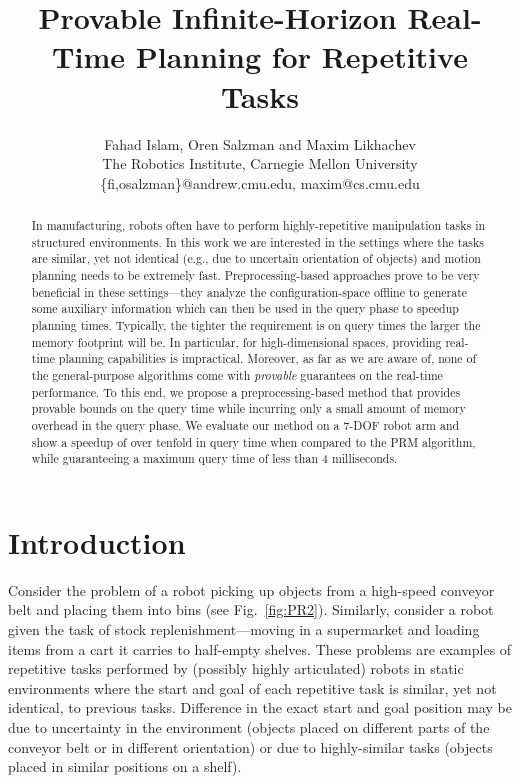 \documentclass[letterpaper]{article} %
\begin{document}
%
\title{Provable Infinite-Horizon Real-Time Planning for Repetitive Tasks}
\author{
Fahad Islam,
Oren Salzman {\normalfont and}
Maxim Likhachev
\\
The Robotics Institute, Carnegie Mellon University\\
%
\{fi,osalzman\}@andrew.cmu.edu,
maxim@cs.cmu.edu
}
\maketitle

\begin{abstract}
In manufacturing, robots often have to perform highly-repetitive manipulation tasks in structured environments. 
In this work we are interested in the settings where the tasks are similar, yet not identical (e.g., due to uncertain orientation of objects) and motion planning needs to be extremely fast. 
Preprocessing-based approaches prove to be very beneficial in these settings---they analyze the configuration-space offline to generate some auxiliary information which can then be used in the query phase to speedup planning times. 
%
Typically, the tighter the requirement is on query times the larger the memory footprint will be. In particular, for high-dimensional spaces, providing real-time planning capabilities is impractical.
Moreover, as far as we are aware of, none of the general-purpose algorithms come with \emph{provable} guarantees on the real-time performance.
%
To this end, we propose a preprocessing-based method that provides provable bounds on the query time while incurring only a small amount of memory overhead in the query phase.
We evaluate our method on a 7-DOF robot arm and show a speedup of over tenfold in query time when compared to the \textsf{PRM} algorithm, while guaranteeing a maximum query time of less than 4 milliseconds.
\end{abstract}

\section{Introduction}

Consider the problem of a robot picking up objects from a high-speed conveyor belt and placing them into bins (see Fig.~\ref{fig:PR2}).
Similarly, consider a robot given the task of stock replenishment---moving in a supermarket and loading items from a cart it carries to half-empty shelves.
These problems are examples of repetitive tasks performed by (possibly highly articulated) robots in static environments where the start and goal of each repetitive task is similar, yet not identical, to previous tasks.
Difference in the exact start and goal position may be due to uncertainty in the environment (objects placed on different parts of the conveyor belt or in different orientation) or due to highly-similar tasks (objects placed in similar positions on a shelf).
\end{document}
